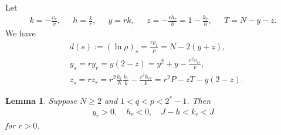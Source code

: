 \documentclass{article}
\newtheorem{lemma}[theorem]{Lemma}
\theoremstyle{definition} \theoremstyle{remark}
\numberwithin{equation}{section}
\begin{document}
	Let
	\begin{align*}
		k = -\frac{v_r}{v}, \quad~~ h = \frac{k}{r}, \quad~~ y = rk, \quad~~ z = -\frac{rh_r}{h} = 1 - \frac{k_r}{h}, \quad~~ T = N - y - z.
	\end{align*}
	We have
	\begin{align}
		& d(s) := (\ln \rho)_s = \frac{r\rho_r}{\rho} = N - 2(y+z), \\
		& y_s = ry_r = y(2-z) = y^2 + y - \frac{r^2v_{rr}}{v}, \label{ys}\\
		& z_s = rz_r = r^2\frac{h_r}{h}\frac{k_r}{k} - \frac{r^2k_{rr}}{k} = r^2P - zT - y(2-z). \label{zs}
 	\end{align}

	\begin{lemma} \label{lemestimate}
		Suppose $N \ge 2$ and $1 < q < p < 2^* -1$. Then
		\begin{align} \label{usefulestimate1}
			y_r > 0, \quad h_r < 0, \quad J - h < k_r < J
		\end{align}
		for $r > 0$.
	\end{lemma}
\end{document}
